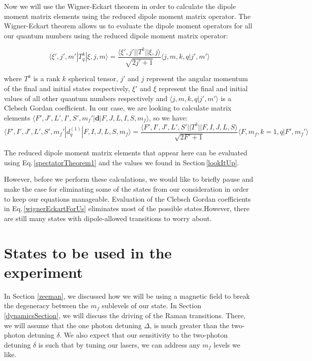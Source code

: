 Now we will use the Wigner-Eckart theorem in order to calculate the dipole moment matrix elements using the reduced dipole moment matrix operator. The Wigner-Eckart theorem allows us to evaluate the dipole moment operators for all our quantum numbers using the reduced dipole moment matrix operator:

\begin{equation}\label{wignerEckart}
\langle \xi',j',m'|T^k_q|\xi,j,m\rangle = \frac{\langle \xi',j'||T^k||\xi,j\rangle}{\sqrt{2j'+1}}\langle j,m,k,q|j',m'\rangle
\end{equation}

where $T^k$ is a rank $k$ spherical tensor, $j'$ and $j$ represent the angular momentum of the final and initial states respectively, $\xi'$ and $\xi$ represent the final and initial values of all other quantum numbers respectively and $\langle j,m,k,q|j',m'\rangle$ is a Clebsch Gordan coefficient. In our case, we are looking to calculate matrix elements  $\langle F',J',L',I',S',m_f'|\mathbf{d}|F,J,L,I,S,m_f\rangle$, so we have:
\begin{equation}\label{wignerEckartForUs}
\langle F',I',J',L',S',m_f'|d^{(1)}_q|F,I,J,L,S,m_f\rangle = \frac{\langle F',I',J',L',S'||T^k||F,I,J,L,S\rangle}{\sqrt{2F'+1}}\langle F,m_f,k=1,q|F',m_f'\rangle
\end{equation}

The reduced dipole moment matrix elements that appear here can be evaluated using Eq.\,\ref{spectatorTheorem1} and the values we found in Section\,\ref{lookItUp}. 

However, before we perform these calculations, we would like to briefly pause and make the case for eliminating some of the states from our consideration in order to keep our equations manageable. 
Evaluation of the Clebsch Gordan coefficients in Eq.\,\ref{wignerEckartForUs} eliminates most of the possible states.However, there are still many states with dipole-allowed transitions to worry about. 

\section{States to be used in the experiment}
\label{figureOutStatesSection}

In Section \ref{zeeman}, we discussed how we will be using a magnetic field to break the degeneracy between the $m_f$ sublevels of our state.
In Section \ref{dynamicsSection}, we will discuss the driving of the Raman transitions. There, we will assume that the one photon detuning $\Delta$, is much greater than the two-photon detuning $\delta$. We also expect that our sensitivity to the two-photon detuning $\delta$ is such that by tuning our lasers, we can address any $m_f$ levels we like.

